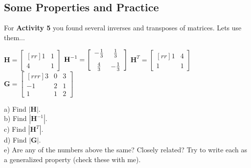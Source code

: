 \documentclass{article}
\begin{document}
\begin{flushleft}
\newpage
\begin{center}
\section{Some Properties and Practice}
\end{center}
For \textbf{Activity 5} you found several inverses and transposes of matrices. Lets use them...\\
\begin{center}
$\textbf{H}=\begin{bmatrix}[rr]
1 & 1\\
4  & 1
\end{bmatrix}$
\hspace{0.5in}
$\textbf{H}^{-1}=\left[
\begin{array}{cc}
- \frac{1}{3} & \frac{1}{3} \vspace{0.1in}\\

\frac{4}{3} & - \frac{1}{3}
\end{array} \right]$
\hspace{0.5in}
$
\textbf{H}^{T}=\begin{bmatrix}[rr]
1 & 4\\
1  & 1
\end{bmatrix}$
\hspace{0.5in}
$\textbf{G}=
\begin{bmatrix}[rrr]
3 & 0 & 3\\
-1 & 2 & 1\\
1 & 1 & 2
\end{bmatrix}$\\
\end{center}

\vspace{0.1in}
a) Find $|\textbf{H}|$.\\
\vspace{0.8in}
b) Find $|\textbf{H}^{-1}|$.\\
\vspace{0.8in}
c) Find $|\textbf{H}^{T}|$.\\
\vspace{0.8in}
d) Find $|\textbf{G}|$.\\
\vspace{1in}
e) Are any of the numbers above the same? Closely related? Try to write each as a generalized property (check these with me).
\newpage
\begin{center}

\end{center}
\end{flushleft}
\end{document}
